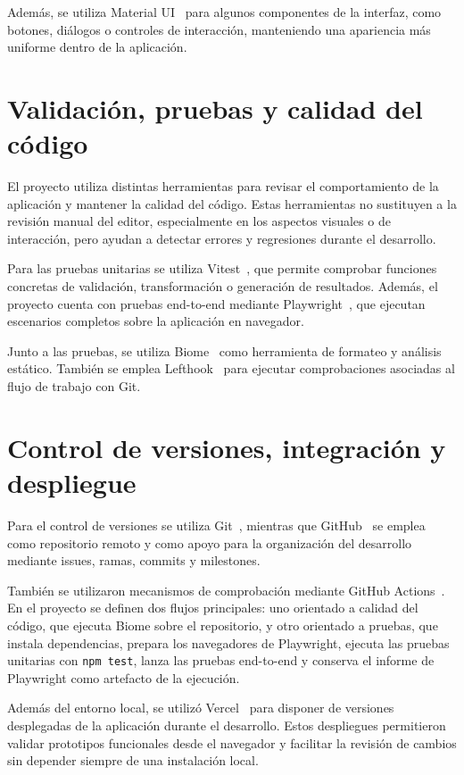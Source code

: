 Además, se utiliza Material UI~\cite{material-ui} para algunos componentes de la interfaz, como botones, diálogos o controles de interacción, manteniendo una apariencia más uniforme dentro de la aplicación.

\section{Validación, pruebas y calidad del código}

El proyecto utiliza distintas herramientas para revisar el comportamiento de la aplicación y mantener la calidad del código. Estas herramientas no sustituyen a la revisión manual del editor, especialmente en los aspectos visuales o de interacción, pero ayudan a detectar errores y regresiones durante el desarrollo.

Para las pruebas unitarias se utiliza Vitest~\cite{vitest}, que permite comprobar funciones concretas de validación, transformación o generación de resultados. Además, el proyecto cuenta con pruebas end-to-end mediante Playwright~\cite{playwright}, que ejecutan escenarios completos sobre la aplicación en navegador.

Junto a las pruebas, se utiliza Biome~\cite{biome} como herramienta de formateo y análisis estático. También se emplea Lefthook~\cite{lefthook} para ejecutar comprobaciones asociadas al flujo de trabajo con Git.

\section{Control de versiones, integración y despliegue}

Para el control de versiones se utiliza Git~\cite{git}, mientras que GitHub~\cite{github} se emplea como repositorio remoto y como apoyo para la organización del desarrollo mediante issues, ramas, commits y milestones.

También se utilizaron mecanismos de comprobación mediante GitHub Actions~\cite{github-actions}. En el proyecto se definen dos flujos principales: uno orientado a calidad del código, que ejecuta Biome sobre el repositorio, y otro orientado a pruebas, que instala dependencias, prepara los navegadores de Playwright, ejecuta las pruebas unitarias con \texttt{npm test}, lanza las pruebas end-to-end y conserva el informe de Playwright como artefacto de la ejecución.

Además del entorno local, se utilizó Vercel~\cite{vercel} para disponer de versiones desplegadas de la aplicación durante el desarrollo. Estos despliegues permitieron validar prototipos funcionales desde el navegador y facilitar la revisión de cambios sin depender siempre de una instalación local.

